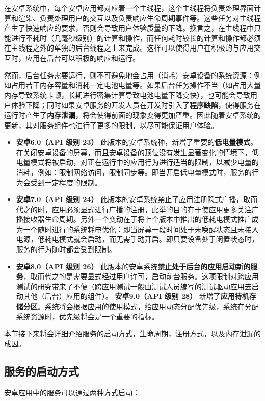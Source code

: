 在安卓系统中，每个安卓应用都对应着一个主线程，这个主线程将负责处理界面计算和渲染、负责处理用户的交互以及负责响应生命周期事件等。这些任务对主线程产生了快速响应的要求，否则会导致用户体验质量的下降。换言之，在主线程中只能进行不耗时（几毫秒级别）的计算和操作，而任何耗时较长的计算和操作都必须在主线程之外的单独的后台线程之上来完成。这样可以使得用户在积极的与应用交互时，应用在后台可以积极的响应和运行。

然而，后台任务需要运行，则不可避免地会占用（消耗）安卓设备的系统资源：例如占用若干内存容量和消耗一定电池电量等。如果后台任务操作不当（如占用大量内存导致系统卡顿，长期进行密集计算导致电池电量下降变快），也可能会导致用户体验下降；同时如果安卓服务的开发人员在开发时引入了\textbf{程序缺陷}，使得服务在运行时产生了\textbf{内存泄漏}，将会使得前面的现象变得更加严重。因此随着安卓系统的更新，其对服务组件也进行了更多的限制，以尽可能保证用户体验。

\begin{itemize}
	\item \textbf{安卓6.0（API 级别 23） } 此版本的安卓系统种，新增了重要的\textbf{低电量模式}。在关闭安卓设备的屏幕，而且安卓设备的顶位没有发生显著变化的情境下，低电量模式将被启动，对正在运行中的应用行为进行适当的限制，以减少电量的消耗，例如：限制网络访问，限制同步等。即当开启低电量模式时，服务的行为会受到一定程度的限制。
	\item \textbf{安卓7.0（API 级别 24）} 此版本的安卓系统禁止了应用注册隐式广播，取而代之的时，应用必须显式进行广播的注册，此举的目的在于使应用更多关注广播接收器生命周期。另外一个变动在于将上个版本中推出的低耗电模式推广成为一个随时进行的系统耗电优化：即当屏幕一段时间处于未唤醒状态且未接入电源，低耗电模式就会启动，而无需手动开启。即只要设备处于闲置状态时，服务的行为随时都会受到限制。
	\item \textbf{安卓8.0（API 级别 26）} 此版本的安卓系统\textbf{禁止处于后台的应用启动新的服务}，取而代之的是需要显式经过用户许可，启动前台服务。这项限制对跨应用测试的研究带来了不便（跨应用测试一般由测试人员编写的测试驱动应用去启动其他（后台）应用的组件）。
	\textbf{安卓9.0（API 级别 28）} 新增了\textbf{应用待机存储分区}。系统将会根据应用的使用模式，给应用动态分配优先级，系统在分配系统资源时，优先级将会是一个重要的指标。
\end{itemize}

本节接下来将会详细介绍服务的启动方式，生命周期，注册方式，以及内存泄漏的成因。

\subsection{服务的启动方式}
安卓应用中的服务可以通过两种方式启动\cite{service}：

